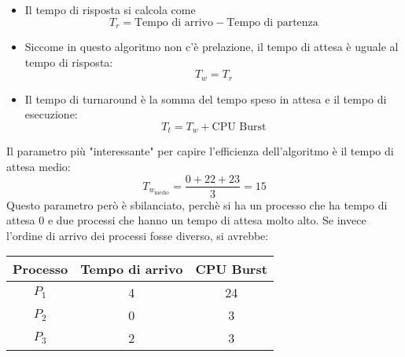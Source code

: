 \documentclass[a4paper]{article}
\begin{document}
\begin{example}
  \noindent
  \begin{itemize}
    \item Il tempo di risposta si calcola come 
      \[
        T_r = \text{Tempo di arrivo} - \text{Tempo di partenza}
      \]
    \item Siccome in questo algoritmo non c'è prelazione, il tempo di attesa è uguale
      al tempo di risposta:
      \[
      T_w = T_r
      \] 
    \item Il tempo di turnaround è la somma del tempo speso in attesa e il tempo di 
      esecuzione:
      \[
        T_t = T_w + \text{CPU Burst}
      \]
  \end{itemize}
  Il parametro più "interessante" per capire l'efficienza dell'algoritmo è il tempo
  di attesa medio:
  \[
    T_{w_{\text{medio}}} = \frac{0 + 22 + 23}{3} = 15
  \] 
  Questo parametro però è sbilanciato, perchè si ha un processo che ha tempo di attesa
  0 e due processi che hanno un tempo di attesa molto alto. Se invece l'ordine di arrivo
  dei processi fosse diverso, si avrebbe:
  \begin{table}[H]
    \centering
    \begin{tabular}{c|c|c}
      Processo & Tempo di arrivo & CPU Burst \\
      \hline
      \( P_1 \) & 4 & 24 \\
      \( P_2 \) & 0 & 3 \\
      \( P_3 \) & 2 & 3 \\
    \end{tabular}
  \end{table}
  \begin{figure}[H]
    \centering
\end{figure}
\end{example}
\end{document}

